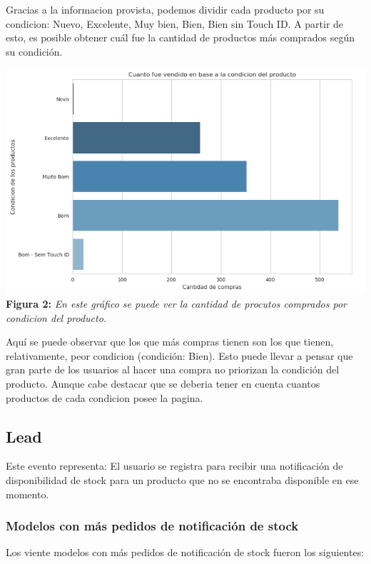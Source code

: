 \documentclass[titlepage,a4paper]{article}
\begin{document}
	Gracias a la informacion provista, podemos dividir cada producto por su condicion: Nuevo, Excelente, Muy bien, Bien, Bien sin Touch ID. A partir de esto, es posible obtener cuál fue la cantidad de productos más comprados según su condición. 
	
	\begin{center}
	\includegraphics[width=14cm]{imagenes/compradosPorCondicion.jpg}\\
	\textbf{Figura 2:}  \textit{En este gráfico se puede ver la cantidad de procutos comprados por condicion del producto. }
	\end{center}
 
  Aquí se puede observar que los que más compras tienen son los que tienen, relativamente, peor condicion (condición: Bien). Esto puede llevar a pensar que gran parte de los usuarios al hacer una compra no priorizan la condición del producto. Aunque cabe destacar que se deberia tener en cuenta cuantos productos de cada condicion posee la pagina.
   
 \subsection{Lead}
 
 Este evento representa: El usuario se registra para recibir una notificación de disponibilidad de stock para un producto que no se encontraba disponible en ese momento.
 
  \subsubsection{Modelos con más pedidos de notificación de stock}
  
  Los viente modelos con más pedidos de notificación de stock fueron los siguientes:
  
\end{document}
